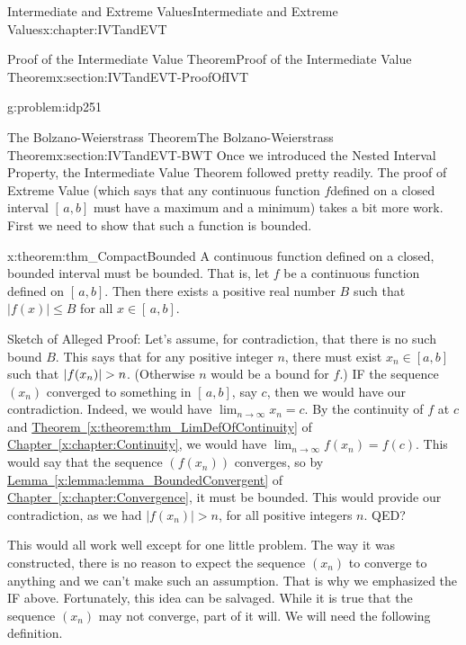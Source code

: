 \begin{chapterptx}{Intermediate and Extreme Values}{}{Intermediate and Extreme Values}{}{}{x:chapter:IVTandEVT}
\begin{sectionptx}{Proof of the Intermediate Value Theorem}{}{Proof of the Intermediate Value Theorem}{}{}{x:section:IVTandEVT-ProofOfIVT}
\begin{problem}{}{g:problem:idp251}
		\end{problem}
	\end{sectionptx}
	\typeout{************************************************}
	\typeout{************************************************}
	\begin{sectionptx}{The Bolzano-Weierstrass Theorem}{}{The Bolzano-Weierstrass Theorem}{}{}{x:section:IVTandEVT-BWT}
		Once we introduced the Nested Interval Property, the Intermediate Value Theorem followed pretty readily. The proof of Extreme Value (which says that any continuous function \(f\)defined on a closed interval \([\,a,b]\) must have a maximum and a minimum) takes a bit more work. First we need to show that such a function is bounded.%
		\begin{theorem}{}{}{x:theorem:thm_CompactBounded}%
			 A continuous function defined on a closed, bounded interval must be bounded.  That is, let \(f\) be a continuous function defined on \([\,a,b]\).  Then there exists a positive real number \(B\) such that \(|f(x)|\leq B\) for all \(x\in[\,a,b]\).%
		\end{theorem}
		\alert{Sketch of Alleged Proof:} Let's assume, for contradiction, that there is no such bound \(B\). This says that for any positive integer \(n\), there must exist \(x_n\in[a,b]\) such that \(\abs{f(x_n)}>n\). (Otherwise \(n\) would be a bound for \(f\).) \alert{IF} the sequence \(\left(x_n\right)\) converged to something in \([\,a,b]\), say \(c\), then we would have our contradiction. Indeed, we would have \(\lim_{n\rightarrow\infty}x_n=c\). By the continuity of \(f\) at \(c\) and \hyperref[x:theorem:thm_LimDefOfContinuity]{Theorem~{\xreffont\ref{x:theorem:thm_LimDefOfContinuity}}} of \hyperref[x:chapter:Continuity]{Chapter~{\xreffont\ref{x:chapter:Continuity}}}, we would have \(\lim_{n\rightarrow\infty}f(x_n)=f(c)\). This would say that the sequence \(\left(f(x_n)\right)\) converges, so by \hyperref[x:lemma:lemma_BoundedConvergent]{Lemma~{\xreffont\ref{x:lemma:lemma_BoundedConvergent}}} of \hyperref[x:chapter:Convergence]{Chapter~{\xreffont\ref{x:chapter:Convergence}}}, it must be bounded. This would provide our contradiction, as we had \(|f(x_n)|>n\), for all positive integers \(n\). \alert{QED?}%
		\par
		This would all work well except for one little problem. The way it was constructed, there is no reason to expect the sequence \(\left(x_n\right)\) to converge to anything and we can't make such an assumption. That is why we emphasized the \alert{IF} above. Fortunately, this idea can be salvaged. While it is true that the sequence \(\left(x_n\right)\) may not converge, part of it will. We will need the following definition.%

\end{sectionptx}
\end{chapterptx}
